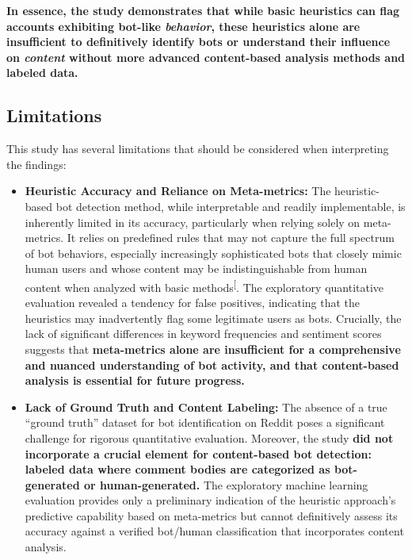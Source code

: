 \documentclass[
  12pt,
  letterpaper,
  DIV=11,
  numbers=noendperiod]{scrartcl}
\begin{document}
\textbf{In essence, the study demonstrates that while basic heuristics
can flag accounts exhibiting bot-like \emph{behavior}, these heuristics
alone are insufficient to definitively identify bots or understand their
influence on \emph{content} without more advanced content-based analysis
methods and labeled data.}

\subsection{Limitations}\label{limitations}

This study has several limitations that should be considered when
interpreting the findings:

\begin{itemize}
\item
  \textbf{Heuristic Accuracy and Reliance on Meta-metrics:} The
  heuristic-based bot detection method, while interpretable and readily
  implementable, is inherently limited in its accuracy, particularly
  when relying solely on meta-metrics. It relies on predefined rules
  that may not capture the full spectrum of bot behaviors, especially
  increasingly sophisticated bots that closely mimic human users and
  whose content may be indistinguishable from human content when
  analyzed with basic
  methods\textsuperscript{{[}\citeproc{ref-botdetectionreddit}{1}{]}}.
  The exploratory quantitative evaluation revealed a tendency for false
  positives, indicating that the heuristics may inadvertently flag some
  legitimate users as bots. Crucially, the lack of significant
  differences in keyword frequencies and sentiment scores suggests that
  \textbf{meta-metrics alone are insufficient for a comprehensive and
  nuanced understanding of bot activity, and that content-based analysis
  is essential for future progress.}
\item
  \textbf{Lack of Ground Truth and Content Labeling:} The absence of a
  true ``ground truth'' dataset for bot identification on Reddit poses a
  significant challenge for rigorous quantitative evaluation. Moreover,
  the study \textbf{did not incorporate a crucial element for
  content-based bot detection: labeled data where comment bodies are
  categorized as bot-generated or human-generated.} The exploratory
  machine learning evaluation provides only a preliminary indication of
  the heuristic approach's predictive capability based on meta-metrics
  but cannot definitively assess its accuracy against a verified
  bot/human classification that incorporates content analysis.

\end{itemize}
\end{document}
